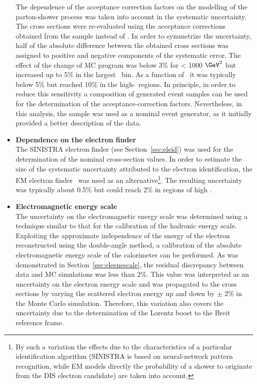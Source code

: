 \begin{itemize}
		The dependence of the acceptance correction factors on the modelling of the parton-shower process was taken into account in the systematic uncertainty. The cross sections were re-evaluated using the acceptance corrections obtained from the \ariadne sample instead of \lepto. In order to symmetrize the uncertainty, half of the absolute difference between the obtained cross sections was assigned to positive and negative components of the systematic error. The effect of the change of MC program was below 3\% for \qsq < 1000 $\GeV^2$ but increased up to 5\% in the largest \qsq~bin. As a function of \etjetb~it was typically below 5\% but reached 10\% in the high-\etjetb~regions.
In principle, in order to reduce this sensitivity a composition of generated event samples can be used for the determination of the acceptance-correction factors. Nevertheless, in this analysis, the \lepto sample was used as a nominal event generator, as it initially provided a better description of the data.
			
	\item \textbf{Dependence on the electron finder}\\
		The \textsc{SINISTRA} electron finder (see Section~\ref{sec:eleid}) was used for the determination of the nominal cross-section values. In order to estimate the size of the systematic uncertainty attributed to the electron identification, the \textsc{EM} electron finder~\cite{epj:c11:427,upub:Straub:url} was used as an alternative\footnote{By such a variation the effects due to the characteristics of a particular identification algorithm (SINISTRA is based on neural-network pattern recognition, while EM models directly the probability of a shower to originate from the DIS electron candidate) are taken into account.}. The resulting uncertainty was typically about 0.5\% but could reach 2\% in regions of high \qsq.
	
	\item \textbf{Electromagnetic energy scale}\\
		The uncertainty on the electromagnetic energy scale was determined using a technique similar to that for the calibration of the hadronic energy scale. Exploiting the approximate independence of the energy of the electron reconstructed using the double-angle method, a calibration of the absolute electromagnetic energy scale of the calorimeter can be performed. As was demonstrated in Section~\ref{sec:eleenescale}, the residual discrepancy between data and MC simulations was less than 2\%. This value was interpreted as an uncertainty on the electron energy scale and was propagated to the cross sections by varying the scattered electron energy up and down by $\pm$ 2\% in the Monte Carlo simulation. Therefore, this variation also covers the uncertainty due to the determination of the Lorentz boost to the Breit reference frame. 
	

\end{itemize}
